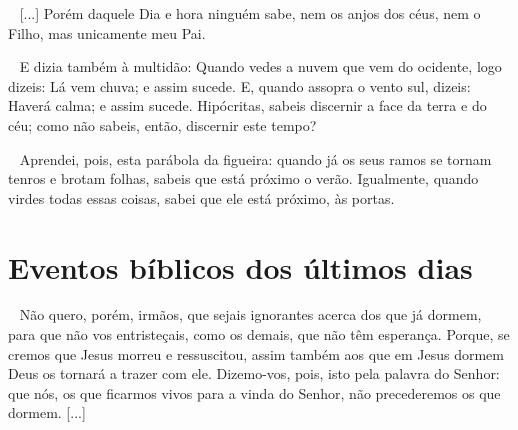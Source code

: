 \documentclass[12pt,aspectratio=169]{beamer}
\newcommand{\ver}[1]{%
    \raisebox{0.50ex}{%
        \scalebox{1.1}{%
            \pmb{\textbf{\textcolor{BSpbg}{#1}}}%
        }%
    }%
}
\newcommand{\QUOTE}[1]{%
    \par\noindent\hspace*{0.1\linewidth}%
    \begin{minipage}{0.8\linewidth}%
        \linespread{1.35}\large{#1}%
    \end{minipage}%
}
\newcommand{\WIDEQUOTE}[1]{%
    \par\noindent\hspace*{0.02\linewidth}%
    \begin{minipage}{0.92\linewidth}%
        \linespread{1.25}\large{#1}%
    \end{minipage}%
}
\newcommand{\RED}[1]{{\textcolor{TXred}{#1}}}
\newcommand{\YEL}[1]{{\textcolor{TXyel}{#1}}}
\newcommand{\GRE}[1]{{\textcolor{TXgre}{#1}}}
\newcommand{\CYA}[1]{{\textcolor{TXcya}{#1}}}
\newcommand{\MAG}[1]{{\textcolor{TXmag}{#1}}}
\begin{document}
    \begin{frame}
        \QUOTE{%
            \ver{(ARC) Mt~24.32--36}~%
            [...] Porém daquele \MAG{Dia e hora} ninguém sabe, nem os anjos dos céus, nem o
            Filho, mas unicamente meu Pai.
        }
    \end{frame}

    \begin{frame}
        \QUOTE{%
            \ver{(ARC) Lc~12.54--56}~%
            E \CYA{dizia} também à multidão: \YEL{Quando vedes}  a  \GRE{nuvem  que  vem  do
            ocidente}, logo \YEL{dizeis}: \GRE{Lá  vem  chuva};  \MAG{e  assim  sucede}.  E,
            \YEL{quando} \GRE{assopra o vento sul}, \YEL{dizeis}: \GRE{Haverá calma}; \MAG{e
            assim sucede}. \RED{Hipócritas, sabeis discernir a face da terra e do céu;  como
            não sabeis, então, discernir este tempo?}
        }
    \end{frame}

    \begin{frame}
        \QUOTE{%
            \ver{(ARC) Mt~24.32,33}~%
            \MAG{Aprendei}, pois, esta parábola da figueira: \YEL{quando}  \GRE{já  os  seus
            ramos se tornam tenros e brotam folhas}, \YEL{sabeis} \GRE{que  está  próximo  o
            verão}.  \MAG{Igualmente},  \YEL{quando}  \GRE{virdes   todas   essas   coisas},
            \YEL{sabei} que \GRE{ele está próximo, às portas}.
        }
    \end{frame}

\section{Eventos bíblicos dos últimos dias}

    \begin{frame}
        \WIDEQUOTE{%
            \ver{(ARC) 1Ts~4.13--18}~%
            Não quero, porém, irmãos, que sejais ignorantes acerca dos que já  dormem,  para
            que não vos entristeçais, \RED{como os demais, que não têm  esperança}.  Porque,
            se cremos que \YEL{Jesus morreu e ressuscitou}, \CYA{assim  também  aos  que  em
            Jesus dormem Deus os tornará a trazer com  ele}.  Dizemo-vos,  pois,  isto  pela
            palavra do Senhor: que nós, os que ficarmos vivos para a vinda  do  Senhor,  não
            precederemos os que dormem. [...]
        }
    \end{frame}
\end{document}
